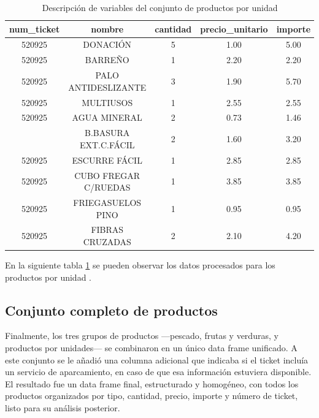 \documentclass[,article,submit,moreauthors,pdftex]{Definitions/mdpi}
\begin{document}
\begin{table}

\caption{\label{tab:tabla_productos_unidad}Descripción de variables del conjunto de productos por unidad}
\centering
\begin{tabular}[t]{ccccc}
\toprule
num\_ticket & nombre & cantidad & precio\_unitario & importe\\
\midrule
520925 & DONACIÓN & 5 & 1.00 & 5.00\\
520925 & BARREÑO & 1 & 2.20 & 2.20\\
520925 & PALO ANTIDESLIZANTE & 3 & 1.90 & 5.70\\
520925 & MULTIUSOS & 1 & 2.55 & 2.55\\
520925 & AGUA MINERAL & 2 & 0.73 & 1.46\\
\addlinespace
520925 & B.BASURA EXT.C.FÁCIL & 2 & 1.60 & 3.20\\
520925 & ESCURRE FÁCIL & 1 & 2.85 & 2.85\\
520925 & CUBO FREGAR C/RUEDAS & 1 & 3.85 & 3.85\\
520925 & FRIEGASUELOS PINO & 1 & 0.95 & 0.95\\
520925 & FIBRAS CRUZADAS & 2 & 2.10 & 4.20\\
\bottomrule
\end{tabular}
\end{table}

En la siguiente tabla \ref{tab:tabla_productos_unidad} se pueden
observar los datos procesados para los productos por unidad .

\hypertarget{conjunto-completo-de-productos}{%
\subsection{Conjunto completo de
productos}\label{conjunto-completo-de-productos}}

Finalmente, los tres grupos de productos ---pescado, frutas y verduras,
y productos por unidades--- se combinaron en un único data frame
unificado. A este conjunto se le añadió una columna adicional que
indicaba si el ticket incluía un servicio de aparcamiento, en caso de
que esa información estuviera disponible. El resultado fue un data frame
final, estructurado y homogéneo, con todos los productos organizados por
tipo, cantidad, precio, importe y número de ticket, listo para su
análisis posterior.
\end{document}
